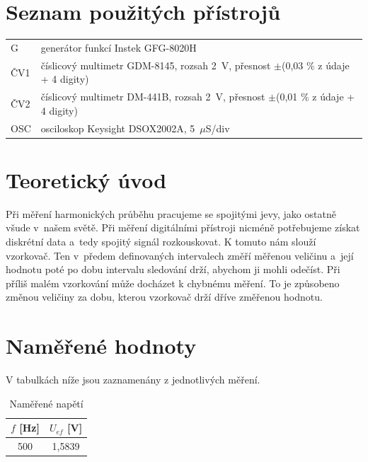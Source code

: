 \documentclass[a4paper,12pt]{article}   %
\newcommand{\tmu}{$\mu$}
\newcommand{\tpm}{$\pm$}
\begin{document}
\section{Seznam použitých přístrojů}
\label{chap:seznam_pristroju}
\begin{table}[H]
  \begin{tabular}{ll}
        G & generátor funkcí Instek GFG-8020H\\
        ČV1 & číslicový multimetr GDM-8145, rozsah 2~V, přesnost \tpm (0,03 \% z údaje + 4 digity)\\
        ČV2 & číslicový multimetr DM-441B, rozsah 2~V, přesnost \tpm (0,01 \% z údaje + 4 digity)\\
        OSC & osciloskop Keysight DSOX2002A, 5~\tmu S/div\\
  \end{tabular}
\end{table}

\section{Teoretický úvod}
\label{chap:teoreticky_uvod}
Při měření harmonických průběhu pracujeme se spojitými jevy, jako ostatně všude v~našem světě. Při měření digitálními přístroji nicméně potřebujeme získat diskrétní data a~tedy spojitý signál rozkouskovat. K tomuto nám slouží vzorkovač. Ten v~předem definovaných intervalech změří měřenou veličinu a~její hodnotu poté po dobu intervalu sledování drží, abychom ji mohli odečíst. Při příliš malém vzorkování může docházet k chybnému měření. To je způsobeno změnou veličiny za dobu, kterou vzorkovač drží dříve změřenou hodnotu.

\section{Naměřené hodnoty}
\label{chap:namerene_hodnoty}
V tabulkách níže jsou zaznamenány z jednotlivých měření.
\begin{table}[h!]
  \centering
  \begin{tabular}{|c|c|}
    \hline
    $f$ [Hz]&$U_{ef}$ [V]\\\hline\hline
    500&1,5839\\\hline
  \end{tabular}
  \caption{Naměřené napětí}
  \label{tab:napeti}  
\end{table}
\end{document}
